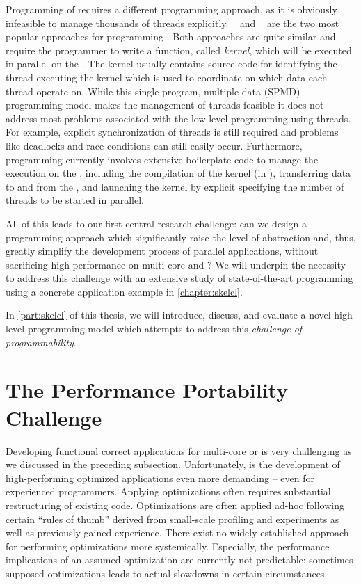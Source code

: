 Programming of \GPUs requires a different programming approach, as it is obviously infeasible to manage thousands of threads explicitly.
\CUDA~\cite{CUDAProgrammingGuide} and \OpenCL~\cite{OpenCL} are the two most popular approaches for programming \GPUs.
Both approaches are quite similar and require the programmer to write a function, called \emph{kernel}, which will be executed in parallel on the \GPU.
The kernel usually contains source code for identifying the thread executing the kernel which is used to coordinate on which data each thread operate on.
While this single program, multiple data (SPMD) programming model makes the management of threads feasible it does not address most problems associated with the low-level programming using threads.
For example, explicit synchronization of threads is still required and problems like deadlocks and race conditions can still easily occur.
Furthermore, \GPU programming currently involves extensive boilerplate code to manage the execution on the \GPU, including the compilation of the kernel (in \OpenCL), transferring data to and from the \GPU, and launching the kernel by explicit specifying the number of threads to be started in parallel.

All of this leads to our first central research challenge:
can we design a programming approach which significantly raise the level of abstraction and, thus, greatly simplify the development process of parallel applications, without sacrificing high-performance on multi-core \CPUs and \GPUs?
We will underpin the necessity to address this challenge with an extensive study of state-of-the-art \GPU programming using a concrete application example in \autoref{chapter:skelcl}.

In \autoref{part:skelcl} of this thesis, we will introduce, discuss, and evaluate a novel high-level programming model which attempts to address this \emph{challenge of programmability}.

\section{The Performance Portability Challenge}

Developing functional correct applications for multi-core \CPUs or \GPUs is very challenging as we discussed in the preceding subsection.
Unfortunately, is the development of high-performing optimized applications even more demanding -- even for experienced programmers.
Applying optimizations often requires substantial restructuring of existing code.
Optimizations are often applied ad-hoc following certain ``rules of thumb'' derived from small-scale profiling and experiments as well as previously gained experience.
There exist no widely established approach for performing optimizations more systemically.
Especially, the performance implications of an assumed optimization are currently not predictable:
sometimes supposed optimizations leads to actual slowdowns in certain circumstances.

